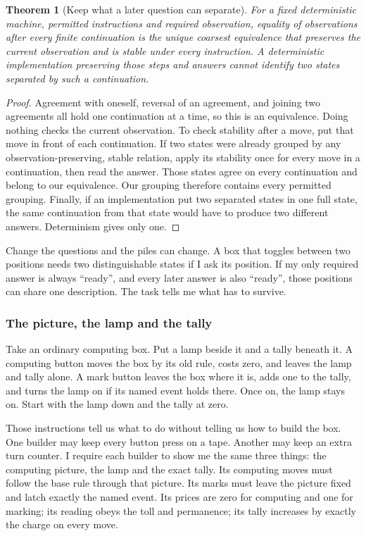\documentclass[11pt,twoside]{article}
\theoremstyle{thielethm}
\newtheorem{theorem}{Theorem}[section]
\theoremstyle{thieledef}
\theoremstyle{thieledef}
\theoremstyle{thieledef}
\theoremstyle{thielethm}
\theoremstyle{thieleobs}
\theoremstyle{thielethm}
\begin{document}
\begin{theorem}[Keep what a later question can separate]\label{thm:future-reading-equivalence}
For a fixed deterministic machine, permitted instructions and required
observation, equality of observations after every finite continuation is
the unique coarsest equivalence that preserves the current observation and
is stable under every instruction. A deterministic implementation preserving
those steps and answers cannot identify two states separated by such a
continuation.
\end{theorem}
\begin{proof}
Agreement with oneself, reversal of an agreement, and joining two agreements
all hold one continuation at a time, so this is an equivalence. Doing nothing
checks the current observation. To check stability after a move, put that
move in front of each continuation. If two states were already grouped by
any observation-preserving, stable relation, apply its stability once for
every move in a continuation, then read the answer. Those states agree on
every continuation and belong to our equivalence. Our grouping therefore
contains every permitted grouping. Finally, if an implementation put two
separated states in one full state, the same continuation from that state
would have to produce two different answers. Determinism gives only one.
\end{proof}

Change the questions and the piles can change. A box that toggles between
two positions needs two distinguishable states if I ask its position. If
my only required answer is always ``ready'', and every later answer is also
``ready'', those positions can share one description. The task tells me
what has to survive.

\subsubsection*{The picture, the lamp and the tally}

Take an ordinary computing box. Put a lamp beside it and a tally beneath it.
A computing button moves the box by its old rule, costs zero, and leaves
the lamp and tally alone. A mark button leaves the box where it is, adds
one to the tally, and turns the lamp on if its named event holds there.
Once on, the lamp stays on. Start with the lamp down and the tally at zero.

Those instructions tell us what to do without telling us how to build the
box. One builder may keep every button press on a tape. Another may keep an
extra turn counter. I require each builder to show me the same three things:
the computing picture, the lamp and the exact tally. Its computing moves
must follow the base rule through that picture. Its marks must leave the
picture fixed and latch exactly the named event. Its prices are zero for
computing and one for marking; its reading obeys the toll and permanence;
its tally increases by exactly the charge on every move.
\end{document}
